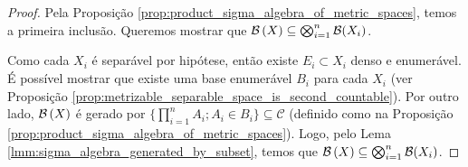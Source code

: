 \begin{proof}
    Pela Proposição \ref{prop:product_sigma_algebra_of_metric_spaces}, temos a primeira inclusão. Queremos mostrar que $\mathcal{B}\left(X\right)\subseteq \bigotimes_{i=1}^{n} \mathcal{B}(X_i)$.  
    
    Como cada $X_i$ é separável por hipótese, então existe $E_i\subset X_i$ denso e enumerável. É possível mostrar que existe uma base enumerável $B_i$ para cada $X_i$ (ver Proposição \ref{prop:metrizable_separable_space_is_second_countable}). Por outro lado, $\mathcal{B}\left(X\right)$ é gerado por $\{\prod_{i=1}^{n} A_i; A_i\in B_i \} \subseteq \mathcal{C}$ (definido como na Proposição \ref{prop:product_sigma_algebra_of_metric_spaces}). Logo, pelo Lema \ref{lmm:sigma_algebra_generated_by_subset}, temos que $\mathcal{B}\left(X\right)\subseteq \bigotimes_{i=1}^{n} \mathcal{B}(X_i)$.
\end{proof}